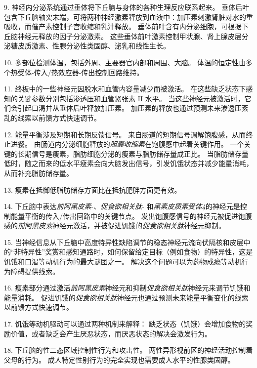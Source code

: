 9. 神经内分泌系统通过垂体将下丘脑与身体的各种生理反应联系起来。
垂体后叶包含下丘脑轴突末端，可将两种神经激素释放到血液中：加压素刺激肾脏对水的重吸收，而催产素控制子宫收缩和乳汁释放。
垂体前叶含有内分泌细胞，可根据下丘脑神经元释放的因子分泌激素。
这些垂体前叶激素控制甲状腺、肾上腺皮层分泌糖皮质激素、性腺分泌性类固醇、泌乳和线性生长。


10. 多部位检测体温，包括外周、主要器官内部和周围、大脑。
体温的恒定性由多个热受体-传入/热效应器-传出控制回路维持。


11. 终板中的一些神经元因脱水和血管内容量减少而被激活。
在这些缺乏状态下感知的关键参数分别包括渗透压和血管紧张素 II 水平。
当这些神经元被激活时，它们会引起口渴并从垂体后叶释放加压素。
加压素的释放也通过预测未来渗透压紊乱的线索以前馈方式快速调节。 


12. 能量平衡涉及短期和长期反馈信号。
来自肠道的短期信号调解饱腹感，从而终止进餐。
由肠道内分泌细胞释放的\textit{胆囊收缩素}在饱腹感中起着关键作用。
一个关键的长期信号是瘦素，脂肪细胞分泌的瘦素与脂肪储存量成正比。
当脂肪储存量低时，随之而来的低水平瘦素会向大脑发出信号，引发饥饿状态并减少能量消耗，从而补充脂肪储存量。 


13. 瘦素在抵御低脂肪储存方面比在抵抗肥胖方面更有效。 


14. 下丘脑中表达\textit{前阿黑皮素}-、\textit{促食欲相关肽}- 和\textit{黑素皮质素受体4}的神经元是控制能量平衡的传入/传出回路中的关键节点。
发出饱腹感信号的神经元被促进饱腹感的\textit{前阿黑皮素}神经元激活，并被促进饥饿的\textit{促食欲相关肽}神经元抑制。


15. 当神经信息从下丘脑中高度特异性缺陷调节的稳态神经元流向伏隔核和皮层中的“非特异性”奖赏和感知通路时，如何保留给定目标（例如食物）的特异性，这是饥饿和口渴等动机行为的最大谜团之一。
解决这个问题可以为药物成瘾等动机行为障碍提供线索。 


16. 瘦素部分通过激活\textit{前阿黑皮素}神经元和抑制\textit{促食欲相关肽}神经元来调节饥饿和能量消耗。
促进饥饿的\textit{促食欲相关肽}神经元也通过预测未来能量平衡变化的线索以前馈方式快速调节。


17. 饥饿等动机驱动可以通过两种机制来解释：
缺乏状态（饥饿）会增加食物的奖励价值，或者缺乏会产生厌恶状态，而厌恶状态的解决会激发行为。 


18. 下丘脑的性二态区域控制性行为和攻击性。
两性异形视前区的神经活动控制着父母的行为。
成人特定性别行为的完全实现也需要成人水平的性腺类固醇。

